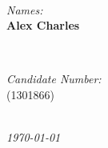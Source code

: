 \documentclass{article}
\newcommand{\StudentNameA}{Alex Charles}
\newcommand{\StudentNumberA}{1301866}
\begin{document}
\begin{titlepage}
\begin{minipage}{0.4\textwidth}
\begin{flushright}
\end{flushright}
\end{minipage}\\[1cm]

\begin{minipage}{0.4\textwidth}
\begin{flushleft} \large
\emph{Names:}\\
	\textbf{\StudentNameA}
\end{flushleft}
\end{minipage}
~
\begin{minipage}{0.4\textwidth}
\begin{flushright} \large
\emph{Candidate Number:} \\
(\StudentNumberA)\\
\end{flushright}
\end{minipage}\\[2cm]

\textit{{\large \today}}\\[1cm] %
\vfill %
\end{titlepage}


\newpage
\end{document}
